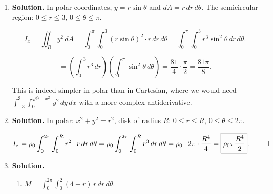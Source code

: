 \begin{enumerate}
\begin{enumerate}
Average temperature:
\[
T_{\text{avg}} = \frac{1}{A}\int_0^2\int_0^{4-x^2}(10+xy)\,dy\,dx.
\]

\item Inner integral:
\[
\int_0^{4-x^2}(10+xy)\,dy = \left[10y+\frac{xy^2}{2}\right]_0^{4-x^2} = 10(4-x^2)+\frac{x(4-x^2)^2}{2}.
\]

Expanding: $10(4-x^2) = 40-10x^2$ and $\frac{x(16-8x^2+x^4)}{2} = 8x-4x^3+\frac{x^5}{2}$.

Outer integral:
\begin{align*}
&\int_0^2\left(40-10x^2+8x-4x^3+\frac{x^5}{2}\right)dx \\
&= \left[40x-\frac{10x^3}{3}+4x^2-x^4+\frac{x^6}{12}\right]_0^2 \\
&= 80-\frac{80}{3}+16-16+\frac{64}{12} = 80-\frac{80}{3}+\frac{16}{3} = 80-\frac{64}{3} = \frac{240-64}{3} = \frac{176}{3}.
\end{align*}

\[
T_{\text{avg}} = \frac{3}{16}\cdot\frac{176}{3} = \frac{176}{16} = \boxed{11\,{}^\circ\text{C}}.
\]
\end{enumerate}

\item \textbf{Solution.}
In polar coordinates, $y = r\sin\theta$ and $dA = r\,dr\,d\theta$. The semicircular region: $0\le r\le 3$, $0\le\theta\le\pi$.

\[
I_x = \iint_R y^2\,dA = \int_0^\pi\int_0^3 (r\sin\theta)^2\cdot r\,dr\,d\theta = \int_0^\pi\int_0^3 r^3\sin^2\theta\,dr\,d\theta.
\]

\[
= \left(\int_0^3 r^3\,dr\right)\!\left(\int_0^\pi\sin^2\theta\,d\theta\right) = \frac{81}{4}\cdot\frac{\pi}{2} = \boxed{\frac{81\pi}{8}}.
\]

This is indeed simpler in polar than in Cartesian, where we would need $\int_{-3}^3\int_0^{\sqrt{9-x^2}}y^2\,dy\,dx$ with a more complex antiderivative.

\item \textbf{Solution.}
In polar: $x^2+y^2 = r^2$, disk of radius $R$: $0\le r\le R$, $0\le\theta\le 2\pi$.

\[
I_z = \rho_0\int_0^{2\pi}\int_0^R r^2\cdot r\,dr\,d\theta = \rho_0\int_0^{2\pi}\int_0^R r^3\,dr\,d\theta = \rho_0\cdot 2\pi\cdot\frac{R^4}{4} = \boxed{\rho_0\pi\frac{R^4}{2}}. \qed
\]

\item \textbf{Solution.}
\begin{enumerate}
\item $\displaystyle M = \int_0^{2\pi}\int_0^2(4+r)\,r\,dr\,d\theta$.


\end{enumerate}
\end{enumerate}
